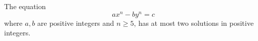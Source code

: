 \begin{proposition}\label{eq:162}
    The equation
\[
    ax^n-by^n=c
\]
    where $a,b$ are positive integers and $n\ge5$, has at most two solutions in positive integers.
\end{proposition}
